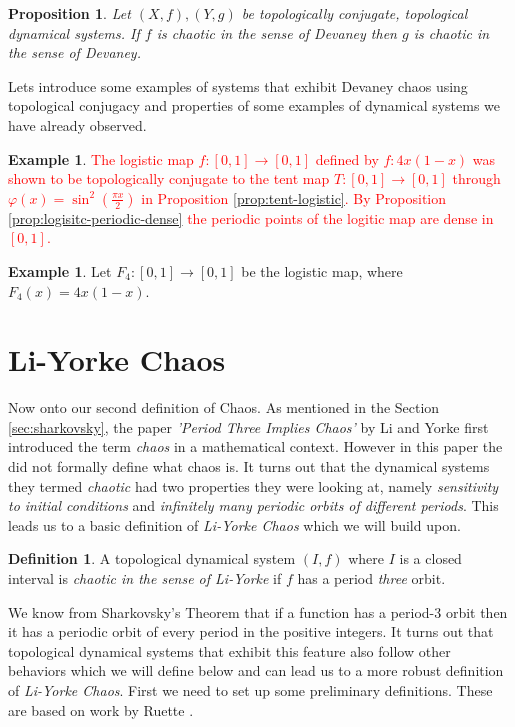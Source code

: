 \documentclass[11pt,a4paper,oneside]{memoir}
\theoremstyle{plain}
\newtheorem{prop}[thm]{Proposition}
\theoremstyle{definition}
\newtheorem{defn}[thm]{Definition}
\newtheorem{exmp}[thm]{Example}
\begin{document}
\begin{prop}
    Let $(X, f), (Y, g)$ be topologically conjugate, topological dynamical systems. If $f$ is chaotic in the sense of Devaney then $g$ is chaotic in the sense of Devaney.
\end{prop}

Lets introduce some examples of systems that exhibit Devaney chaos using topological conjugacy and properties of some examples of dynamical systems we have already observed.

\begin{exmp}
    \textcolor{red}{The logistic map $f: [0, 1] \to [0, 1]$ defined by $f: 4x (1-x)$ was shown to be topologically conjugate to the tent map $T: [0, 1] \to [0, 1]$ through $\varphi(x) = \sin^2(\frac{\pi x}{2})$ in Proposition \ref{prop:tent-logistic}. By Proposition \ref{prop:logisitc-periodic-dense} the periodic points of the logitic map are dense in $[0,1]$. }
\end{exmp}

\begin{exmp}
    Let $F_4: [0, 1] \to [0,1]$ be the logistic map, where $F_4(x) = 4x(1-x)$.
\end{exmp}

\section{Li-Yorke Chaos}

Now onto our second definition of Chaos. As mentioned in the Section \ref{sec:sharkovsky}, the paper \emph{'Period Three Implies Chaos'} by Li and Yorke \cite{li-yorke} first introduced the term \emph{chaos} in a mathematical context. However in this paper the did not formally define what chaos is. It turns out that the dynamical systems they termed \emph{chaotic} had two properties they were looking at, namely \emph{sensitivity to initial conditions} and \emph{infinitely many periodic orbits of different periods}. This leads us to a basic definition of \emph{Li-Yorke Chaos} which we will build upon.

\begin{defn}
    A topological dynamical system $(I, f)$ where $I$ is a closed interval is \emph{chaotic in the sense of Li-Yorke} if $f$ has a period \emph{three} orbit.
\end{defn}

We know from Sharkovsky's Theorem that if a function has a period-3 orbit then it has a periodic orbit of every period in the positive integers. It turns out that topological dynamical systems that exhibit this feature also follow other behaviors which we will define below and can lead us to a more robust definition of \emph{Li-Yorke Chaos}. First we need to set up some preliminary definitions. These are based on work by Ruette \cite[Section 5.1]{ruette}.
\end{document}
